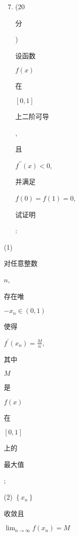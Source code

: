 \documentclass[10pt]{article}
\begin{document}
\begin{enumerate}
  \setcounter{enumi}{6}
  \item (20 \begin{CJK}{UTF8}{mj}分\end{CJK}) \begin{CJK}{UTF8}{mj}设函数\end{CJK} $f(x)$ \begin{CJK}{UTF8}{mj}在\end{CJK} $[0,1]$ \begin{CJK}{UTF8}{mj}上二阶可导\end{CJK}, \begin{CJK}{UTF8}{mj}且\end{CJK} $f^{\prime \prime}(x)<0$, \begin{CJK}{UTF8}{mj}并满足\end{CJK} $f(0)=f(1)=0$, \begin{CJK}{UTF8}{mj}试证明\end{CJK}:
\end{enumerate}
(1) \begin{CJK}{UTF8}{mj}对任意整数\end{CJK} $n$, \begin{CJK}{UTF8}{mj}存在唯\end{CJK} $-x_{n} \in(0,1)$ \begin{CJK}{UTF8}{mj}使得\end{CJK} $f^{\prime}\left(x_{n}\right)=\frac{M}{n}$, \begin{CJK}{UTF8}{mj}其中\end{CJK} $M$ \begin{CJK}{UTF8}{mj}是\end{CJK} $f(x)$ \begin{CJK}{UTF8}{mj}在\end{CJK} $[0,1]$ \begin{CJK}{UTF8}{mj}上的\end{CJK} \begin{CJK}{UTF8}{mj}最大值\end{CJK};

(2) $\left\{x_{n}\right\}$ \begin{CJK}{UTF8}{mj}收敛且\end{CJK} $\lim _{n \rightarrow \infty} f\left(x_{n}\right)=M$
\end{document}
